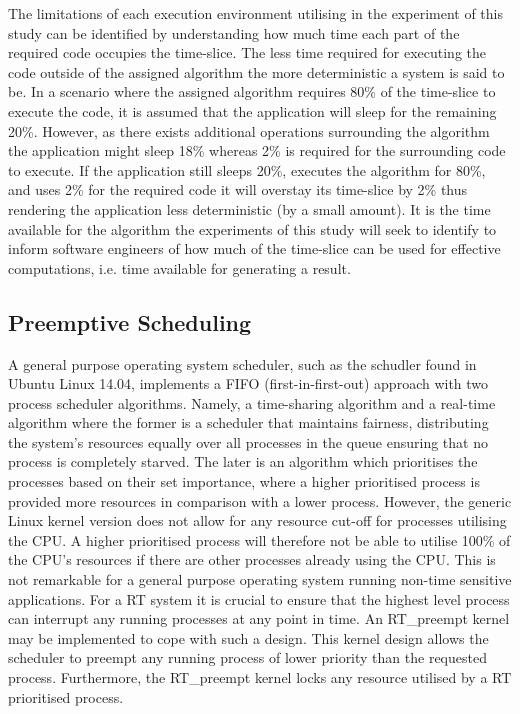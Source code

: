 The limitations of each execution environment utilising in the experiment of this study can be identified by understanding how much time each part of the required code occupies the time-slice. The less time required for executing the code outside of the assigned algorithm the more deterministic a system is said to be. In a scenario where the assigned algorithm requires 80\% of the time-slice to execute the code, it is assumed that the application will sleep for the remaining 20\%. However, as there exists additional operations surrounding the algorithm the application might sleep 18\% whereas 2\% is required for the surrounding code to execute. If the application still sleeps 20\%, executes the algorithm for 80\%, and uses 2\% for the required code it will overstay its time-slice by 2\% thus rendering the application less deterministic (by a small amount). It is the time available for the algorithm the experiments of this study will seek to identify to inform software engineers of how much of the time-slice can be used for effective computations, i.e. time available for generating a result.

\subsection{Preemptive Scheduling}
A general purpose operating system scheduler, such as the schudler found in Ubuntu Linux 14.04, implements a FIFO (first-in-first-out) approach with two process scheduler algorithms. Namely, a time-sharing algorithm and a real-time algorithm where the former is a scheduler that maintains fairness, distributing the system's resources equally over all processes in the queue ensuring that no process is completely starved. The later is an algorithm which prioritises the processes based on their set importance, where a higher prioritised process is provided more resources in comparison with a lower process. However, the generic Linux kernel version does not allow for any resource cut-off for processes utilising the CPU. A higher prioritised process will therefore not be able to utilise 100\% of the CPU's resources if there are other processes already using the CPU. This is not remarkable for a general purpose operating system running non-time sensitive applications. For a RT system it is crucial to ensure that the highest level process can interrupt any running processes at any point in time. An RT\_preempt kernel may be implemented to cope with such a design. This kernel design allows the scheduler to preempt any running process of lower priority than the requested process. Furthermore, the RT\_preempt kernel locks any resource utilised by a RT prioritised process.

